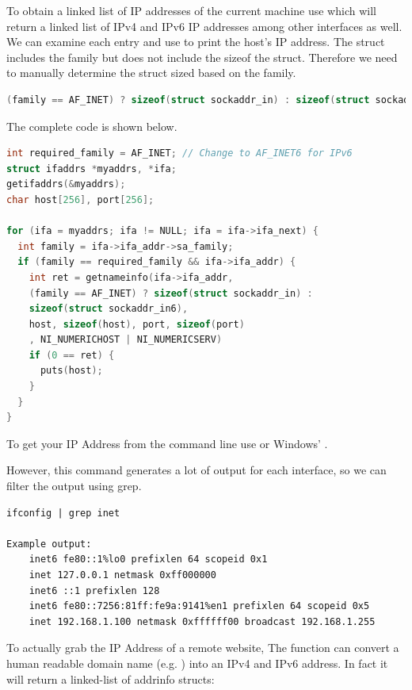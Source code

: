 To obtain a linked list of IP addresses of the current machine use  which will return a linked list of IPv4 and IPv6 IP addresses among other interfaces as well.
We can examine each entry and use  to print the host's IP address.
The  struct includes the family but does not include the sizeof the struct.
Therefore we need to manually determine the struct sized based on the family.

\begin{lstlisting}[language=C]
(family == AF_INET) ? sizeof(struct sockaddr_in) : sizeof(struct sockaddr_in6)
\end{lstlisting}

The complete code is shown below.

\begin{lstlisting}[language=C]
int required_family = AF_INET; // Change to AF_INET6 for IPv6
struct ifaddrs *myaddrs, *ifa;
getifaddrs(&myaddrs);
char host[256], port[256];

for (ifa = myaddrs; ifa != NULL; ifa = ifa->ifa_next) {
  int family = ifa->ifa_addr->sa_family;
  if (family == required_family && ifa->ifa_addr) {
    int ret = getnameinfo(ifa->ifa_addr,
    (family == AF_INET) ? sizeof(struct sockaddr_in) :
    sizeof(struct sockaddr_in6),
    host, sizeof(host), port, sizeof(port)
    , NI_NUMERICHOST | NI_NUMERICSERV)
    if (0 == ret) {
      puts(host);
    }
  }
}
\end{lstlisting}

To get your IP Address from the command line use  or Windows' .

However, this command generates a lot of output for each interface, so we can filter the output using grep.

\begin{lstlisting}
ifconfig | grep inet

Example output:
    inet6 fe80::1%lo0 prefixlen 64 scopeid 0x1
    inet 127.0.0.1 netmask 0xff000000
    inet6 ::1 prefixlen 128
    inet6 fe80::7256:81ff:fe9a:9141%en1 prefixlen 64 scopeid 0x5
    inet 192.168.1.100 netmask 0xffffff00 broadcast 192.168.1.255
\end{lstlisting}

To actually grab the IP Address of a remote website, The function  can convert a human readable domain name (e.g. ) into an IPv4 and IPv6 address.
In fact it will return a linked-list of addrinfo structs:

